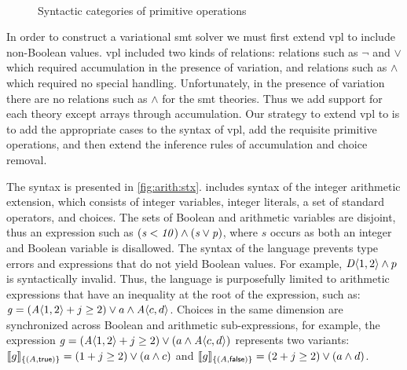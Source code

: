 ~\label{section:vsmt:primitives}
%
\begin{figure}
  
  \caption{Syntactic categories of primitive operations}%
  \label{fig:vsmt:inf:prim}
\end{figure}
%
In order to construct a variational \ac{smt} solver we must first extend
\ac{vpl} to include non-Boolean values. \ac{vpl} included two kinds of
relations: relations such as $\neg$ and $\vee$ which required accumulation in
the presence of variation, and relations such as $\wedge$ which required no
special handling. Unfortunately, in the presence of variation there are no
relations such as $\wedge$ for the \ac{smt} theories. Thus we add support for
each theory except arrays through accumulation. Our strategy to extend \ac{vpl}
to \evpl{} is to add the appropriate cases to the syntax of \ac{vpl}, add the
requisite primitive operations, and then extend the inference rules of
accumulation and choice removal.

The \evpl{} syntax is presented in \autoref{fig:arith:stx}. \evpl{} includes
syntax of the integer arithmetic extension, which consists of integer variables,
integer literals, a set of standard operators, and choices.
%
The sets of Boolean and arithmetic variables are disjoint, thus an expression
such as $(\mathit{s < 10) \wedge (s \vee p})$, where $s$ occurs as both an integer
and Boolean variable is disallowed.
%
The syntax of the language prevents type errors and expressions that do not
yield Boolean values. For example, $\chc[D]{1,2} \wedge p$ is syntactically
invalid.
%
Thus, the language is purposefully limited to arithmetic expressions that
have an inequality at the root of the expression, such as: $\kf{g} =
(\chc[A]{1, 2} + j \geq 2) \vee a \wedge \chc[A]{c, d}$.
%
Choices in the same dimension are synchronized across Boolean and arithmetic
sub-expressions, for example, the expression
%
$\kf{g} = (\chc[A]{1, 2} + j \geq 2) \vee (a \wedge \chc[A]{c,d})$
represents two variants:
%
$\sem[\{(A, \true)\}]{g} = (1 + j \geq 2) \vee (a \wedge c)$ and
$\sem[\{(A, \false)\}]{g} = (2 + j \geq 2) \vee (a \wedge d)$.


